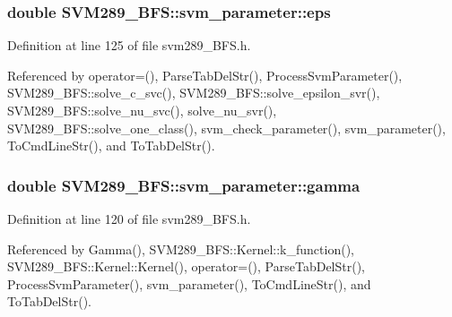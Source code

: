 \subsubsection[{\texorpdfstring{eps}{eps}}]{\setlength{\rightskip}{0pt plus 5cm}double S\+V\+M289\+\_\+\+B\+F\+S\+::svm\+\_\+parameter\+::eps}\hypertarget{struct_s_v_m289___b_f_s_1_1svm__parameter_ade212e0b6eafc29ce3402fd8945d0ebf}{}\label{struct_s_v_m289___b_f_s_1_1svm__parameter_ade212e0b6eafc29ce3402fd8945d0ebf}


Definition at line 125 of file svm289\+\_\+\+B\+F\+S.\+h.



Referenced by operator=(), Parse\+Tab\+Del\+Str(), Process\+Svm\+Parameter(), S\+V\+M289\+\_\+\+B\+F\+S\+::solve\+\_\+c\+\_\+svc(), S\+V\+M289\+\_\+\+B\+F\+S\+::solve\+\_\+epsilon\+\_\+svr(), S\+V\+M289\+\_\+\+B\+F\+S\+::solve\+\_\+nu\+\_\+svc(), solve\+\_\+nu\+\_\+svr(), S\+V\+M289\+\_\+\+B\+F\+S\+::solve\+\_\+one\+\_\+class(), svm\+\_\+check\+\_\+parameter(), svm\+\_\+parameter(), To\+Cmd\+Line\+Str(), and To\+Tab\+Del\+Str().

\subsubsection[{\texorpdfstring{gamma}{gamma}}]{\setlength{\rightskip}{0pt plus 5cm}double S\+V\+M289\+\_\+\+B\+F\+S\+::svm\+\_\+parameter\+::gamma}\hypertarget{struct_s_v_m289___b_f_s_1_1svm__parameter_a88d6cddc31287ac0483272ff3fb9ea45}{}\label{struct_s_v_m289___b_f_s_1_1svm__parameter_a88d6cddc31287ac0483272ff3fb9ea45}


Definition at line 120 of file svm289\+\_\+\+B\+F\+S.\+h.



Referenced by Gamma(), S\+V\+M289\+\_\+\+B\+F\+S\+::\+Kernel\+::k\+\_\+function(), S\+V\+M289\+\_\+\+B\+F\+S\+::\+Kernel\+::\+Kernel(), operator=(), Parse\+Tab\+Del\+Str(), Process\+Svm\+Parameter(), svm\+\_\+parameter(), To\+Cmd\+Line\+Str(), and To\+Tab\+Del\+Str().

